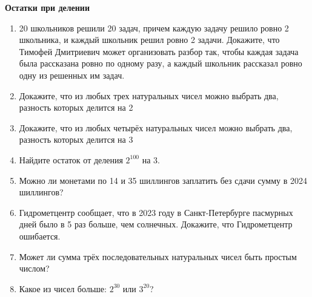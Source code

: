 \documentclass{article}
\begin{document}
\large
	
\begin{center}
	\textbf{Остатки при делении}
\end{center}


\begin{enumerate}[label*=\protect\fbox{\arabic{enumi}}]


\item 20 школьников решили 20 задач, причем каждую задачу решило ровно 2 школьника, и каждый школьник решил ровно 2 задачи. Докажите, что Тимофей Дмитриевич может организовать разбор так, чтобы каждая задача была рассказана ровно по одному разу, а каждый школьник рассказал ровно одну из решенных им задач.

\item Докажите, что из любых трех натуральных чисел можно выбрать два, разность которых делится на 2

\item Докажите, что из любых четырёх натуральных чисел можно выбрать два, разность которых делится на 3

\item Найдите остаток от деления $2^{100}$ на 3.

\item Можно ли монетами по 14 и 35 шиллингов заплатить без сдачи сумму в 2024 шиллингов?

\item Гидрометцентр сообщает, что в 2023 году в Санкт-Петербурге пасмурных дней было в 5 раз больше, чем солнечных. Докажите, что Гидрометцентр ошибается.

\item Может ли сумма трёх последовательных натуральных чисел быть простым числом?

\item Какое из чисел больше: $2^{30}$ или $3^{20}$?





\end{enumerate}
\end{document}
